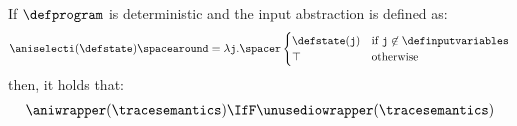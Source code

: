 \newpage
{}
\begin{proposition}
  If $\defprogram$ is deterministic and the input abstraction is defined as:
  \begin{align*}
    \aniselecti(\defstate) \spacearound= \lambda \texttt{j}. \spacer
    \begin{cases}
      \defstate(\texttt{j}) & \text{if } \texttt{j} \not\in \definputvariables \\
      \top & \text{otherwise}
    \end{cases}
  \end{align*}
  then, it holds that:
  \begin{align*}
    \aniwrapper(\tracesemantics) \IfF \unusediowrapper(\tracesemantics)
  \end{align*}
\end{proposition}
